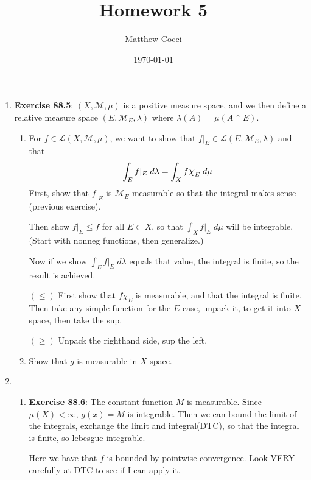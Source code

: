 \documentclass[12pt]{article}
\author{Matthew Cocci}
\title{\textbf{Homework 5}}
\date{\today}
\theoremstyle{plain}
\theoremstyle{definition}
\theoremstyle{remark}
\newcommand*{\Chi}{\mbox{\large$\chi$}} %
\begin{document}
\maketitle 

\begin{enumerate} 

\item \textbf{Exercise 88.5}: $(X,\mathscr{M},\mu)$ is a positive measure space, and we then define a relative measure space $(E,\mathscr{M}_E,\lambda)$ where $\lambda(A)=\mu(A\cap E)$.

\begin{enumerate}
\item For $f\in\mathscr{L}(X,\mathscr{M},\mu)$, we want to show that $f|_E \in\mathscr{L}(E,\mathscr{M}_E,\lambda)$ and that
\[
    \int_E f|_E \; d\lambda = \int_X f \Chi_E\; d\mu
\]
First, show that $f|_E$ is $\mathscr{M}_E$ measurable so that the integral makes sense (previous exercise).

Then show $f|_E \leq f$ for all $E\subset X$, so that $\int_X f|_E \; d\mu$ will be integrable. (Start with nonneg functions, then generalize.) 

Now if we show $\int_E f|_E \; d\lambda$ equals that value, the integral is finite, so the result is achieved.

$(\leq)$ First show that $f\chi_E$ is measurable, and that the integral is finite. Then take any simple function for the $E$ case, unpack it, to get it into $X$ space, then take the sup.

$(\geq)$ Unpack the righthand side, sup the left.

\item Show that $g$ is measurable in $X$ space.  

\end{enumerate}

\item 

\begin{enumerate} 
        

\item \textbf{Exercise 88.6}: The constant function $M$ is measurable. Since $\mu(X)<\infty$, $g(x)=M$ is integrable. Then we can bound the limit of the integrals, exchange the limit and integral(DTC), so that the integral is finite, so lebesgue integrable.

Here we have that $f$ is bounded by pointwise convergence. Look VERY carefully at DTC to see if I can apply it.


\end{enumerate}
\end{enumerate}
\end{document}

